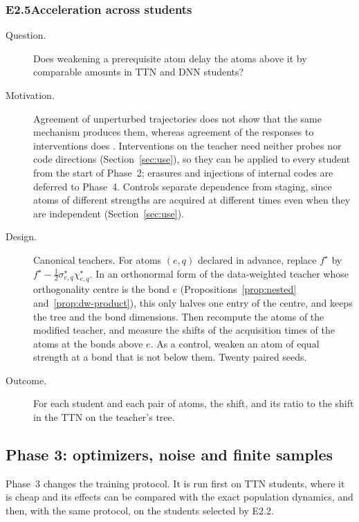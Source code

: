 \documentclass[11pt]{article}
\theoremstyle{definition}
\numberwithin{equation}{section}
\begin{document}
\subsubsection*{E2.5\quad Acceleration across students}
\begin{description}
\item[Question.] Does weakening a prerequisite atom delay the atoms above it by comparable amounts in TTN and DNN students?
\item[Motivation.] Agreement of unperturbed trajectories does not show that the same mechanism produces them, whereas agreement of the responses to interventions does \citep[Section~7.6]{hfl_surrogate}. Interventions on the teacher need neither probes nor code directions (Section~\ref{sec:use}), so they can be applied to every student from the start of Phase~2; erasures and injections of internal codes are deferred to Phase~4. Controls separate dependence from staging, since atoms of different strengths are acquired at different times even when they are independent (Section~\ref{sec:use}).
\item[Design.] Canonical teachers. For atoms $(e,q)$ declared in advance, replace $f^\star$ by $f^\star-\tfrac12\sigma^\star_{e,q}\chi^\star_{e,q}$. In an orthonormal form of the data-weighted teacher whose orthogonality centre is the bond $e$ (Propositions~\ref{prop:nested} and~\ref{prop:dw-product}), this only halves one entry of the centre, and keeps the tree and the bond dimensions. Then recompute the atoms of the modified teacher, and measure the shifts of the acquisition times of the atoms at the bonds above $e$. As a control, weaken an atom of equal strength at a bond that is not below them. Twenty paired seeds.
\item[Outcome.] For each student and each pair of atoms, the shift, and its ratio to the shift in the TTN on the teacher's tree.
\end{description}

\subsection{Phase 3: optimizers, noise and finite samples}\label{sec:exp-phase3}

Phase~3 changes the training protocol. It is run first on TTN students, where it is cheap and its effects can be compared with the exact population dynamics, and then, with the same protocol, on the students selected by E2.2.
\end{document}
